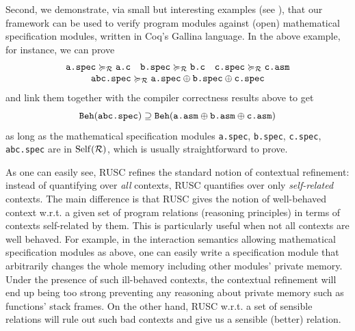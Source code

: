 Second, we demonstrate, via small but interesting examples (see ),
that our framework can be used to verify program modules
against (open) mathematical specification modules, written in Coq's Gallina language.
In the above example, for instance, we can prove
\[
\begin{array}{c}
\texttt{a.spec} \succcurlyeq_{\mathcal{R}} \texttt{a.c}\quad
\texttt{b.spec} \succcurlyeq_{\mathcal{R}} \texttt{b.c}\quad
\texttt{c.spec} \succcurlyeq_{\mathcal{R}} \texttt{c.asm}
\\
\texttt{abc.spec} \succcurlyeq_{\mathcal{R}} \texttt{a.spec} \oplus \texttt{b.spec} \oplus \texttt{c.spec}
\end{array}
\]
and link them together with the compiler correctness results above to get
\[
\beh{\texttt{abc.spec}}
\supseteq %
\beh{\texttt{a.asm} \llink \texttt{b.asm} \llink \texttt{c.asm}}
\]
as long as the mathematical specification modules \texttt{a.spec},
\texttt{b.spec}, \texttt{c.spec}, \texttt{abc.spec} are in $\mathrm{Self}(\mathcal{R})$,
which is usually straightforward to prove.

%
As one can easily see, RUSC refines the standard notion of contextual
refinement: instead of quantifying over \emph{all} contexts, RUSC
quantifies over only \emph{self-related} contexts. The main difference
is that RUSC gives the notion of well-behaved context w.r.t. a given
set of program relations (\ie reasoning principles) in terms of
contexts self-related by them.  This is particularly useful when not
all contexts are well behaved.  For example, in the interaction
semantics allowing mathematical specification modules as above, one can
easily write a specification module that arbitrarily changes the whole
memory including other modules' private memory. Under the presence of
such ill-behaved contexts, the contextual refinement will end up being too
strong preventing any reasoning about private memory such as
functions' stack frames. On the other hand, RUSC w.r.t. a set of
sensible relations will rule out such bad contexts and give us a sensible (better) relation.



